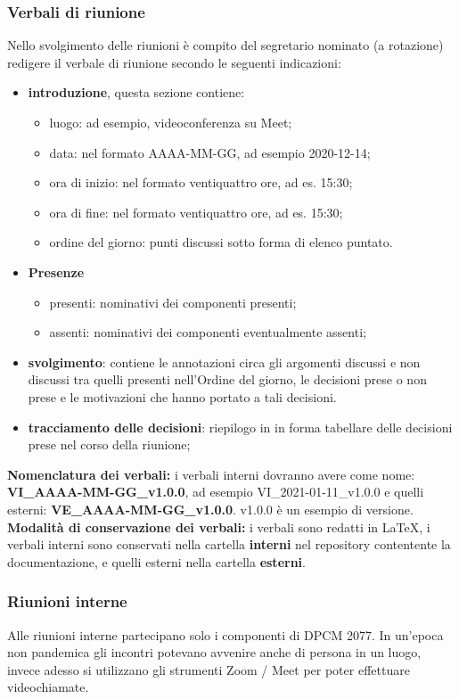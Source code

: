 \subsubsection{Verbali di riunione}
Nello svolgimento delle riunioni è compito del segretario nominato (a rotazione) redigere il verbale di riunione secondo le seguenti indicazioni:
\begin{itemize}
\item{\textbf{introduzione}, questa sezione contiene:}
	\begin{itemize}
	\item{luogo: ad esempio, videoconferenza su Meet;}
	\item{data: nel formato AAAA-MM-GG, ad esempio 2020-12-14;}
	\item{ora di inizio:  nel formato ventiquattro ore, ad es. 15:30;}
	\item{ora di fine:  nel formato ventiquattro ore, ad es. 15:30;}
	\item{ordine del giorno: punti discussi sotto forma di elenco puntato.}
	\end{itemize}
\item{\textbf{Presenze}}
	\begin{itemize}
	\item{presenti: nominativi dei componenti presenti;}
	\item{assenti: nominativi dei componenti eventualmente assenti;}
	\end{itemize}
\item{\textbf{svolgimento}: contiene le annotazioni circa gli argomenti discussi e non discussi tra quelli presenti nell’Ordine del giorno, le decisioni prese o non prese e le motivazioni che hanno portato a tali decisioni.}
\item{\textbf{tracciamento delle decisioni}: riepilogo in in forma tabellare delle decisioni prese nel corso della riunione;}
\end{itemize}
\textbf{Nomenclatura dei verbali: } i verbali interni dovranno avere come nome: \textbf{VI\_AAAA-MM-GG\_v1.0.0}, ad esempio VI\_2021-01-11\_v1.0.0 e quelli esterni: \textbf{VE\_AAAA-MM-GG\_v1.0.0}. v1.0.0 è un esempio di versione.\\
\textbf{Modalità di conservazione dei verbali:} i verbali sono redatti in \LaTeX, i verbali interni sono conservati nella cartella \textbf{interni} nel repository  contentente la documentazione, e quelli esterni nella cartella \textbf{esterni}.

\subsubsection{Riunioni interne}
Alle riunioni interne partecipano solo i componenti di DPCM 2077.
In un'epoca non pandemica gli incontri potevano avvenire anche di persona in un luogo, invece adesso si utilizzano gli strumenti Zoom / Meet per poter effettuare videochiamate.


